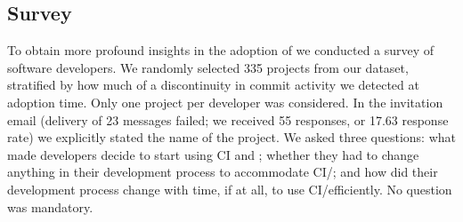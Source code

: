 
\subsection{Survey}
To obtain more profound insights in the adoption of \Tvis we conducted a survey 
of software developers.
We randomly selected 335 projects from our dataset, stratified by how much of a
discontinuity in commit activity we detected at \Tvi adoption time.
Only one project per developer was considered.
In the invitation email (delivery of 23 messages failed; we received 55 responses,
or 17.63 response rate) we explicitly stated the name of the project.
We asked three questions: what made developers decide to start using CI and 
\Tvis; whether they had to change anything in their development process to 
accommodate CI/\Tvi; and how did their development process change with time,
if at all, to use CI/\Tvis efficiently.
No question was mandatory.





